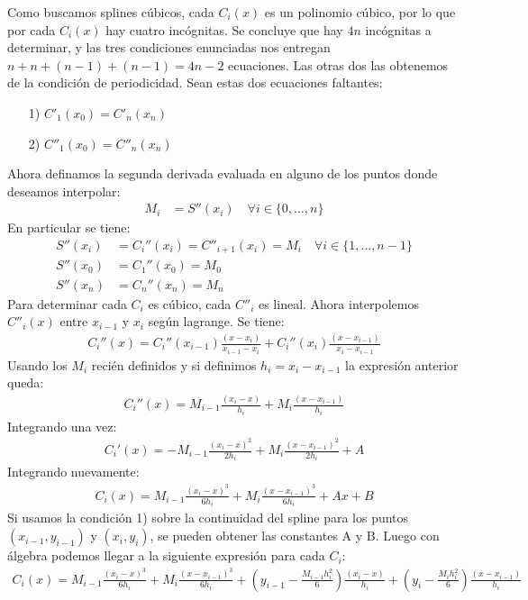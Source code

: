 \documentclass[12pt]{article}
\begin{document}
Como buscamos splines cúbicos, cada $C_i(x)$ es un polinomio cúbico, por lo que por cada $C_i(x)$ hay cuatro incógnitas. Se concluye que hay $4n$ incógnitas a determinar, y las tres condiciones enunciadas nos entregan $n+n+(n-1)+(n-1)=4n-2$ ecuaciones. Las otras dos las obtenemos de la condición de periodicidad. Sean estas dos ecuaciones faltantes:
\begin{itemize}
\item[1)]$C'_1(x_0)=C'_n(x_n)$
\item[2)]$C''_1(x_0)=C''_n(x_n)$
\end{itemize}
Ahora definamos la segunda derivada evaluada en alguno de los puntos donde deseamos interpolar:
\begin{align*}
M_i&=S''(x_i) \quad \forall i\in\{0,\dots,n\} 
\end{align*}
En particular se tiene:
\begin{align*}
S''(x_i)&=C_i''(x_i)=C''_{i+1}(x_i)=M_i \quad \forall i\in\{1,\dots,n-1\} \\
S''(x_0)&=C_1''(x_0)=M_0\\
S''(x_n)&=C_n''(x_n)=M_n
\end{align*}
Para determinar cada $C_i$ es cúbico, cada $C''_i$ es lineal. Ahora interpolemos $C''_i(x)$ entre $x_{i-1}$ y $x_{i}$ según lagrange. Se tiene:
\begin{align*}
C_i''(x)=C_i''(x_{i-1})\frac{(x-x_i)}{x_{i-1}-x_i}+C_i''(x_i)\frac{(x-x_{i-1})}{x_i-x_{i-1}}
\end{align*}
Usando los $M_i$ recién definidos y si definimos $h_i=x_i-x_{i-1}$ la expresión anterior queda:
\begin{align*}
C_i''(x)=M_{i-1}\frac{(x_i-x)}{h_i}+M_i\frac{(x-x_{i-1})}{h_i}
\end{align*}
Integrando una vez:
\begin{align*}
C_i'(x)=-M_{i-1}\frac{(x_i-x)^2}{2h_i}+M_i\frac{(x-x_{i-1})^2}{2h_i}+A
\end{align*}
Integrando nuevamente:
\begin{align*}
C_i(x)=M_{i-1}\frac{(x_i-x)^3}{6h_i}+M_i\frac{(x-x_{i-1})^3}{6h_i}+Ax+B
\end{align*}
Si usamos la condición 1) sobre la continuidad del spline para los puntos $(x_{i-1},y_{i-1})$ y $(x_i,y_i)$, se pueden obtener las constantes A y B. Luego con álgebra podemos llegar a la siguiente expresión para cada $C_i$:
\begin{align}
\label{C's}
C_i(x)=M_{i-1}\frac{(x_i-x)^3}{6h_i}+M_i\frac{(x-x_{i-1})^3}{6h_i}+\left(y_{i-1}-\frac{M_{i-1}h_i^2}{6}\right)\frac{(x_i-x)}{h_i}+\left(y_{i}-\frac{M_{i}h_i^2}{6}\right)\frac{(x-x_{i-1})}{h_i}
\end{align}
\end{document}
